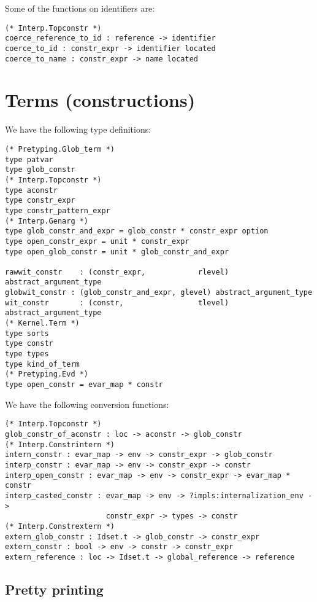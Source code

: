 \documentclass[a4paper,oneside]{book}
\begin{document}
Some of the functions on identifiers are:

\begin{lstlisting}
(* Interp.Topconstr *)
coerce_reference_to_id : reference -> identifier
coerce_to_id : constr_expr -> identifier located
coerce_to_name : constr_expr -> name located
\end{lstlisting}

\section{Terms (constructions)}

We have the following type definitions:

\begin{lstlisting}
(* Pretyping.Glob_term *)
type patvar
type glob_constr
(* Interp.Topconstr *)
type aconstr
type constr_expr
type constr_pattern_expr
(* Interp.Genarg *)
type glob_constr_and_expr = glob_constr * constr_expr option
type open_constr_expr = unit * constr_expr
type open_glob_constr = unit * glob_constr_and_expr

rawwit_constr    : (constr_expr,            rlevel) abstract_argument_type
globwit_constr : (glob_constr_and_expr, glevel) abstract_argument_type
wit_constr       : (constr,                 tlevel) abstract_argument_type
(* Kernel.Term *)
type sorts
type constr
type types
type kind_of_term
(* Pretyping.Evd *)
type open_constr = evar_map * constr
\end{lstlisting}

We have the following conversion functions:

\begin{lstlisting}
(* Interp.Topconstr *)
glob_constr_of_aconstr : loc -> aconstr -> glob_constr
(* Interp.Constrintern *)
intern_constr : evar_map -> env -> constr_expr -> glob_constr
interp_constr : evar_map -> env -> constr_expr -> constr
interp_open_constr : evar_map -> env -> constr_expr -> evar_map * constr
interp_casted_constr : evar_map -> env -> ?impls:internalization_env -> 
                       constr_expr -> types -> constr
(* Interp.Constrextern *)
extern_glob_constr : Idset.t -> glob_constr -> constr_expr
extern_constr : bool -> env -> constr -> constr_expr
extern_reference : loc -> Idset.t -> global_reference -> reference
\end{lstlisting}

\subsection{Pretty printing}
\end{document}
